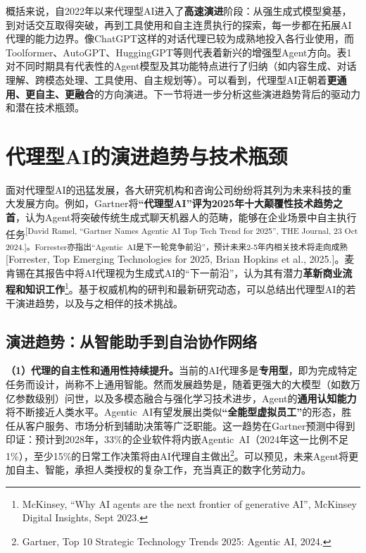 \documentclass[
  letterpaper,
]{scrbook}
\begin{document}
概括来说，自2022年以来代理型AI进入了\textbf{高速演进}阶段：从强生成式模型奠基，到对话交互取得突破，再到工具使用和自主连贯执行的探索，每一步都在拓展AI代理的能力边界。像ChatGPT这样的对话代理已较为成熟地投入各行业使用，而Toolformer、AutoGPT、HuggingGPT等则代表着新兴的增强型Agent方向。表1对不同时期具有代表性的Agent模型及其功能特点进行了归纳（如内容生成、对话理解、跨模态处理、工具使用、自主规划等）。可以看到，代理型AI正朝着\textbf{更通用、更自主、更融合}的方向演进。下一节将进一步分析这些演进趋势背后的驱动力和潜在技术瓶颈。

\section{代理型AI的演进趋势与技术瓶颈}\label{ux4ee3ux7406ux578baiux7684ux6f14ux8fdbux8d8bux52bfux4e0eux6280ux672fux74f6ux9888}

面对代理型AI的迅猛发展，各大研究机构和咨询公司纷纷将其列为未来科技的重大发展方向。例如，Gartner将\textbf{``代理型AI''评为2025年十大颠覆性技术趋势之首}，认为Agent将突破传统生成式聊天机器人的范畴，能够在企业场景中自主执行任务\textsuperscript{{[}David
Ramel, ``Gartner Names Agentic AI Top Tech Trend for 2025'', THE
Journal, 23 Oct
2024.{]}。Forrester亦指出``Agentic~AI是下一轮竞争前沿''，预计未来2-5年内相关技术将走向成熟}{[}Forrester,
Top Emerging Technologies for 2025, Brian Hopkins et al.,
2025.{]}。麦肯锡在其报告中将AI代理视为生成式AI的``下一前沿''，认为其有潜力\textbf{革新商业流程和知识工作}\footnote{McKinsey,
  ``Why AI agents are the next frontier of generative AI'', McKinsey
  Digital Insights, Sept 2023.}。基于权威机构的研判和最新研究动态，可以总结出代理型AI的若干演进趋势，以及与之相伴的技术挑战。

\subsection{演进趋势：从智能助手到自治协作网络}\label{ux6f14ux8fdbux8d8bux52bfux4eceux667aux80fdux52a9ux624bux5230ux81eaux6cbbux534fux4f5cux7f51ux7edc}

\textbf{（1）代理的自主性和通用性持续提升。}当前的AI代理多是\textbf{专用型}，即为完成特定任务而设计，尚称不上通用智能。然而发展趋势是，随着更强大的大模型（如数万亿参数级别）问世，以及多模态融合与强化学习技术进步，Agent的\textbf{通用认知能力}将不断接近人类水平。Agentic~AI有望发展出类似\textbf{``全能型虚拟员工''}的形态，胜任从客户服务、市场分析到辅助决策等广泛职能。这一趋势在Gartner预测中得到印证：预计到2028年，33\%的企业软件将内嵌Agentic~AI（2024年这一比例不足1\%），至少15\%的日常工作决策将由AI代理自主做出\footnote{Gartner,
  Top 10 Strategic Technology Trends 2025: Agentic AI, 2024.}。可以预见，未来Agent将更加自主、智能，承担人类授权的复杂工作，充当真正的数字化劳动力。
\end{document}
